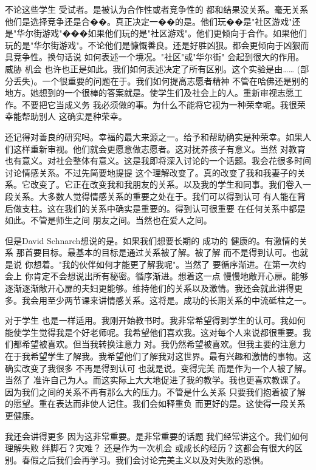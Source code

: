 不论这些学生 受试者。是被认为合作性或者竞争性的 都和结果没关系。毫无关系 他们是选择竞争还是合��。真正决定一��的是。他们玩��是"社区游戏"还是"华尔街游戏"���如果他们玩的是"社区游戏"。他们更倾向于合作。如果他们玩的是"华尔街游戏"。不论他们是慷慨善良。还是好胜凶狠。都会更倾向于凶狠而具竞争性。换句话说 如何表述一个境况。"社区"或"华尔街" 会起到很大的作用。威胁 机会 也许也正是如此。我们如何表述决定了所有区别。这个实验是由…… (部分丢失)。一个很重要的问题在于。我们如何提高志愿者精神 不管在哈佛还是别的地方。她想到的一个很棒的答案就是。使学生们及社会上的人。重新审视志愿工作。不要把它当成义务 我必须做的事。为什么不能将它视为一种荣幸呢。我很荣幸能帮助别人 这确实是种荣幸。 

还记得对善良的研究吗。幸福的最大来源之一。给予和帮助确实是种荣幸。如果人们这样重新审视。他们就会更愿意做志愿者。这对抚养孩子有意义。当然 对教育也有意义。对社会整体有意义。这是我即将深入讨论的一个话题。我会花很多时间讨论情感关系。不过先简要地提提 这个理解改变了。真的改变了我和我妻子的关系。它改变了。它正在改变我和我朋友的关系。以及我的学生和同事。我们卷入一段关系。大多数人觉得情感关系的重要之处在于。我们可以得到认可 有人能在背后做支柱。这在我们的关系中确实是重要的。得到认可很重要 在任何关系中都是如此。不管是师生之间 朋友之间。当然也在爱人之间。 

但是David Schnarch想说的是。如果我们想要长期的 成功的 健康的。有激情的关系 那首要目标。最基本的目标是通过关系被了解。被了解 而不是得到认可。也就是说 你想着。"我的伙伴如何才能更了解我呢"。当然了 要循序渐进。在第一次约会上 你肯定不会想说出所有秘密。循序渐进。想着这一点 慢慢地敞开心扉。能够逐渐逐渐敞开心扉的夫妇更能够。维持他们的关系以及激情。我还会就此讲得更多。我会用至少两节课来讲情感关系。这将是。成功的长期关系的中流砥柱之一。 

对于学生 也是一样适用。我刚开始教书时。我非常希望得到学生的认可。我如何能使学生觉得我是个好老师呢。我希望他们喜欢我。这对每个人来说都很重要。我们都希望被喜欢。但当我转换注意力 对。我仍然希望被喜欢。但我主要的注意力在于我希望学生了解我。我希望他们了解我对这世界。最有兴趣和激情的事物。这确实改变了我很多 不再是得到认可 也就是说。变得完美 而是作为一个人被了解。当然了 准许自己为人。而这实际上大大地促进了我的教学。我也更喜欢教课了。因为我们之间的关系不再有那么大的压力。不管是什么关系 只要我们抱着被了解的愿望。重在表达而非使人记住。我们会如释重负 而更好的是。这使得一段关系更健康。 

我还会讲得更多 因为这非常重要。是非常重要的话题 我们经常讲这个。我们如何理解失败 绊脚石？灾难？ 还是作为一次机会 或成长的经历？这都会有很大的区别。春假之后我们会再学习。我们会讨论完美主义以及对失败的恐惧。 

